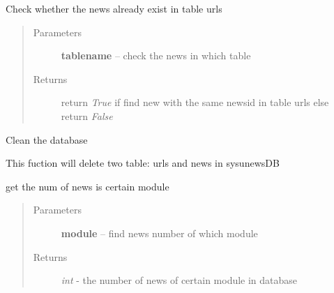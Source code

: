 \documentclass[letterpaper,10pt,english]{sphinxmanual}
\begin{document}
\begin{fulllineitems}
\label{sysunews:sysunews.db_module.check_news}
Check whether the news already exist in table urls
\begin{quote}\begin{description}
\item[{Parameters}] \leavevmode
\textbf{tablename} -- check the news in which table

\item[{Returns}] \leavevmode
return \emph{True} if find new with the same newsid in table urls else return \emph{False}

\end{description}\end{quote}

\end{fulllineitems}


\begin{fulllineitems}
\label{sysunews:sysunews.db_module.cleandb}
Clean the database

This fuction will delete two table: urls and news in sysunewsDB

\end{fulllineitems}


\begin{fulllineitems}
\label{sysunews:sysunews.db_module.get_module_newsNum}
get the num of news is certain module
\begin{quote}\begin{description}
\item[{Parameters}] \leavevmode
\textbf{module} -- find news number of which module

\item[{Returns}] \leavevmode
\emph{int} - the number of news of certain module in database

\end{description}\end{quote}

\end{fulllineitems}
\end{document}
